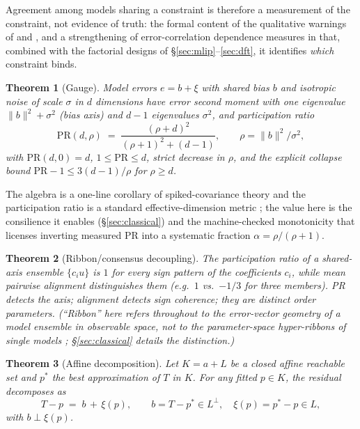 \documentclass[11pt]{article}
\newtheorem{theorem}{Theorem}
\theoremstyle{remark}
\begin{document}
Agreement among models sharing a constraint is therefore a measurement of the
constraint, not evidence of truth: the formal content of the qualitative
warnings of \citep{parker2011} and \citep{pirtle2010}, and a strengthening of
error-correlation dependence measures \citep{bishop2013} in that, combined
with the factorial designs of \S\ref{sec:mlip}--\ref{sec:dft}, it identifies
\emph{which} constraint binds.

\begin{theorem}[Gauge]\label{thm:gauge}
Model errors $e = b + \xi$ with shared bias $b$ and isotropic noise of scale
$\sigma$ in $d$ dimensions have error second moment with one eigenvalue
$\|b\|^2 + \sigma^2$ (bias axis) and $d{-}1$ eigenvalues $\sigma^2$, and
participation ratio
\[
\mathrm{PR}(d,\rho) \;=\; \frac{(\rho+d)^2}{(\rho+1)^2 + (d-1)},
\qquad \rho = \|b\|^2/\sigma^2 ,
\]
with $\mathrm{PR}(d,0)=d$, $1 \le \mathrm{PR} \le d$, strict decrease in
$\rho$, and the explicit collapse bound
$\mathrm{PR}-1 \le 3(d-1)/\rho$ for $\rho \ge d$.
\end{theorem}

The algebra is a one-line corollary of spiked-covariance theory
\citep{johnstone2001} and the participation ratio is a standard
effective-dimension metric \citep{gao2015}; the value here is the consilience
it enables (\S\ref{sec:classical}) and the machine-checked monotonicity that
licenses inverting measured PR into a systematic fraction
$\alpha = \rho/(\rho+1)$.

\begin{theorem}[Ribbon/consensus decoupling]\label{thm:decouple}
The participation ratio of a shared-axis ensemble $\{c_i u\}$ is $1$ for every
sign pattern of the coefficients $c_i$, while mean pairwise alignment
distinguishes them (e.g.\ $1$ vs.\ $-1/3$ for three members). PR detects the
\emph{axis}; alignment detects \emph{sign coherence}; they are distinct order
parameters. (``Ribbon'' here refers throughout to the error-vector geometry of
a model \emph{ensemble} in observable space, not to the parameter-space
hyper-ribbons of single models \citep{transtrum2011,kurniawan2022};
\S\ref{sec:classical} details the distinction.)
\end{theorem}

\begin{theorem}[Affine decomposition]\label{thm:affine}
Let $K = a + L$ be a closed affine reachable set and $p^*$ the best
approximation of $T$ in $K$. For any fitted $p \in K$, the residual decomposes
as
\[
T - p \;=\; b \, +\, \xi(p),
\qquad b = T - p^* \in L^\perp, \quad \xi(p) = p^* - p \in L,
\]
with $b \perp \xi(p)$.
\end{theorem}
\end{document}
